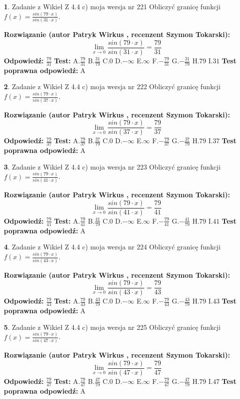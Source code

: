 \documentclass[12pt, a4paper]{article}
\theoremstyle{definition} %
\newtheorem{zad}{}
\newcommand{\zadStart}[1]{\begin{zad}#1\newline}
\newcommand{\zadStop}{\end{zad}}
\newcommand{\rozwStart}[2]{\noindent \textbf{Rozwiązanie (autor #1 , recenzent #2): }\newline}
\newcommand{\rozwStop}{\newline}
\newcommand{\odpStart}{\noindent \textbf{Odpowiedź:}\newline}
\newcommand{\odpStop}{\newline}
\newcommand{\testStart}{\noindent \textbf{Test:}\newline}
\newcommand{\testStop}{\newline}
\newcommand{\kluczStart}{\noindent \textbf{Test poprawna odpowiedź:}\newline}
\newcommand{\kluczStop}{\newline}
\begin{document}
\zadStart{Zadanie z Wikieł Z 4.4 c) moja wersja nr 221}
Obliczyć granicę funkcji $f(x)=\frac{sin(79\cdot x)}{sin(31\cdot x)}$.
\zadStop
\rozwStart{Patryk Wirkus}{Szymon Tokarski}
$$\lim\limits_{x\to 0}\frac{sin(79\cdot x)}{sin(31\cdot x)}=
\frac{79}{31}$$
\rozwStop
\odpStart
$\frac{79}{31}$
\odpStop
\testStart
A.$\frac{79}{31}$
B.$\frac{31}{79}$
C.$0$
D.$-\infty$
E.$\infty$
F.$-\frac{79}{31}$
G.$-\frac{31}{79}$
H.$79$
I.$31$
\testStop
\kluczStart
A
\kluczStop



\zadStart{Zadanie z Wikieł Z 4.4 c) moja wersja nr 222}
Obliczyć granicę funkcji $f(x)=\frac{sin(79\cdot x)}{sin(37\cdot x)}$.
\zadStop
\rozwStart{Patryk Wirkus}{Szymon Tokarski}
$$\lim\limits_{x\to 0}\frac{sin(79\cdot x)}{sin(37\cdot x)}=
\frac{79}{37}$$
\rozwStop
\odpStart
$\frac{79}{37}$
\odpStop
\testStart
A.$\frac{79}{37}$
B.$\frac{37}{79}$
C.$0$
D.$-\infty$
E.$\infty$
F.$-\frac{79}{37}$
G.$-\frac{37}{79}$
H.$79$
I.$37$
\testStop
\kluczStart
A
\kluczStop



\zadStart{Zadanie z Wikieł Z 4.4 c) moja wersja nr 223}
Obliczyć granicę funkcji $f(x)=\frac{sin(79\cdot x)}{sin(41\cdot x)}$.
\zadStop
\rozwStart{Patryk Wirkus}{Szymon Tokarski}
$$\lim\limits_{x\to 0}\frac{sin(79\cdot x)}{sin(41\cdot x)}=
\frac{79}{41}$$
\rozwStop
\odpStart
$\frac{79}{41}$
\odpStop
\testStart
A.$\frac{79}{41}$
B.$\frac{41}{79}$
C.$0$
D.$-\infty$
E.$\infty$
F.$-\frac{79}{41}$
G.$-\frac{41}{79}$
H.$79$
I.$41$
\testStop
\kluczStart
A
\kluczStop



\zadStart{Zadanie z Wikieł Z 4.4 c) moja wersja nr 224}
Obliczyć granicę funkcji $f(x)=\frac{sin(79\cdot x)}{sin(43\cdot x)}$.
\zadStop
\rozwStart{Patryk Wirkus}{Szymon Tokarski}
$$\lim\limits_{x\to 0}\frac{sin(79\cdot x)}{sin(43\cdot x)}=
\frac{79}{43}$$
\rozwStop
\odpStart
$\frac{79}{43}$
\odpStop
\testStart
A.$\frac{79}{43}$
B.$\frac{43}{79}$
C.$0$
D.$-\infty$
E.$\infty$
F.$-\frac{79}{43}$
G.$-\frac{43}{79}$
H.$79$
I.$43$
\testStop
\kluczStart
A
\kluczStop



\zadStart{Zadanie z Wikieł Z 4.4 c) moja wersja nr 225}
Obliczyć granicę funkcji $f(x)=\frac{sin(79\cdot x)}{sin(47\cdot x)}$.
\zadStop
\rozwStart{Patryk Wirkus}{Szymon Tokarski}
$$\lim\limits_{x\to 0}\frac{sin(79\cdot x)}{sin(47\cdot x)}=
\frac{79}{47}$$
\rozwStop
\odpStart
$\frac{79}{47}$
\odpStop
\testStart
A.$\frac{79}{47}$
B.$\frac{47}{79}$
C.$0$
D.$-\infty$
E.$\infty$
F.$-\frac{79}{47}$
G.$-\frac{47}{79}$
H.$79$
I.$47$
\testStop
\kluczStart
A
\kluczStop
\end{document}
